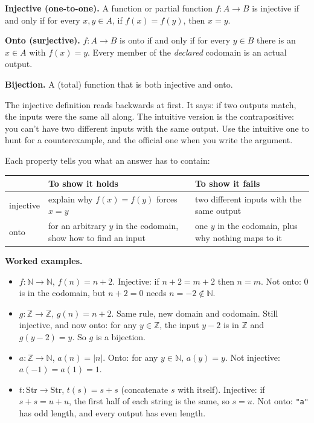 \begin{notebox}
\textbf{Injective (one-to-one).} A function or partial function $f:A\to B$ is injective if and only if for every $x,y\in A$, if $f(x)=f(y)$, then $x=y$.

\textbf{Onto (surjective).} $f:A\to B$ is onto if and only if for every $y\in B$ there is an $x\in A$ with $f(x)=y$. Every member of the \emph{declared} codomain is an actual output.

\textbf{Bijection.} A (total) function that is both injective and onto.
\end{notebox}

The injective definition reads backwards at first. It says: if two outputs match, the inputs were the same all along. The intuitive version is the contrapositive: you can't have two different inputs with the same output. Use the intuitive one to hunt for a counterexample, and the official one when you write the argument.

Each property tells you what an answer has to contain:
\begin{center}
\begin{tabularx}{\linewidth}{@{}lLL@{}}
\toprule
 & To show it holds & To show it fails\\
\midrule
injective & explain why $f(x)=f(y)$ forces $x=y$ & two different inputs with the same output\\
onto & for an arbitrary $y$ in the codomain, show how to find an input & one $y$ in the codomain, plus why nothing maps to it\\
\bottomrule
\end{tabularx}
\end{center}

\textbf{Worked examples.}
\begin{itemize}
\item $f:\mathbb{N}\to\mathbb{N}$, $f(n)=n+2$. Injective: if $n+2=m+2$ then $n=m$. Not onto: $0$ is in the codomain, but $n+2=0$ needs $n=-2\notin\mathbb{N}$.
\item $g:\mathbb{Z}\to\mathbb{Z}$, $g(n)=n+2$. Same rule, new domain and codomain. Still injective, and now onto: for any $y\in\mathbb{Z}$, the input $y-2$ is in $\mathbb{Z}$ and $g(y-2)=y$. So $g$ is a bijection.
\item $a:\mathbb{Z}\to\mathbb{N}$, $a(n)=|n|$. Onto: for any $y\in\mathbb{N}$, $a(y)=y$. Not injective: $a(-1)=a(1)=1$.
\item $t:\text{Str}\to\text{Str}$, $t(s)=s+s$ (concatenate $s$ with itself). Injective: if $s+s=u+u$, the first half of each string is the same, so $s=u$. Not onto: \texttt{"a"} has odd length, and every output has even length.
\end{itemize}

